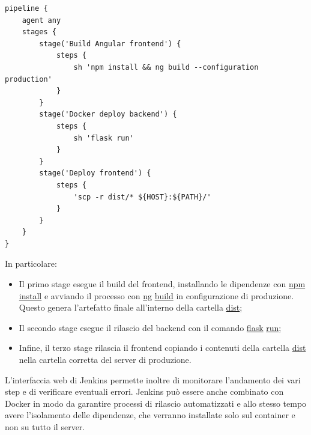\vspace{1mm}
\begin{lstlisting}[]
pipeline {
    agent any
    stages {
		stage('Build Angular frontend') {
			steps {
			    sh 'npm install && ng build --configuration production'
			}
		}
		stage('Docker deploy backend') {
			steps {
				sh 'flask run'
			}
		}
		stage('Deploy frontend') {
			steps {
			    'scp -r dist/* ${HOST}:${PATH}/'
			}
		}
    }
}
\end{lstlisting}

In particolare:

\begin{itemize}
  \item Il primo stage esegue il build del frontend, installando le dipendenze con \url{npm} \url{install} e avviando il processo con \url{ng} \url{build} in configurazione di produzione. Questo genera l'artefatto finale all'interno della cartella \url{dist};
  \item Il secondo stage esegue il rilascio del backend con il comando \url{flask} \url{run};
  \item Infine, il terzo stage rilascia il frontend copiando i contenuti della cartella \url{dist} nella cartella corretta del server di produzione.
\end{itemize}

L'interfaccia web di Jenkins permette inoltre di monitorare l'andamento dei vari step e di verificare eventuali errori. Jenkins può essere anche combinato con Docker \cite{docker} in modo da garantire processi di rilascio automatizzati e allo stesso tempo avere l'isolamento delle dipendenze, che verranno installate solo sul container e non su tutto il server.

